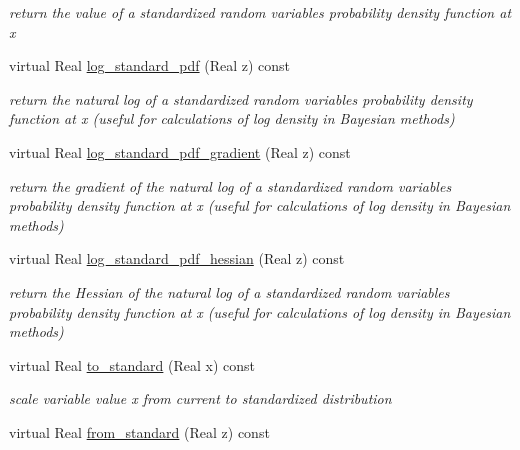 \begin{DoxyCompactItemize}
\begin{DoxyCompactList}\small\item\em return the value of a standardized random variable\textquotesingle{}s probability density function at x \end{DoxyCompactList}\item 
virtual Real \hyperlink{classPecos_1_1RandomVariable_a1eb7deb350fc38d35e32ba7d0b96c464}{log\+\_\+standard\+\_\+pdf} (Real z) const \label{classPecos_1_1RandomVariable_a1eb7deb350fc38d35e32ba7d0b96c464}

\begin{DoxyCompactList}\small\item\em return the natural log of a standardized random variable\textquotesingle{}s probability density function at x (useful for calculations of log density in Bayesian methods) \end{DoxyCompactList}\item 
virtual Real \hyperlink{classPecos_1_1RandomVariable_a73ea75d51f5415f600bebbca4a9628b7}{log\+\_\+standard\+\_\+pdf\+\_\+gradient} (Real z) const \label{classPecos_1_1RandomVariable_a73ea75d51f5415f600bebbca4a9628b7}

\begin{DoxyCompactList}\small\item\em return the gradient of the natural log of a standardized random variable\textquotesingle{}s probability density function at x (useful for calculations of log density in Bayesian methods) \end{DoxyCompactList}\item 
virtual Real \hyperlink{classPecos_1_1RandomVariable_acf89562740c674e54901e97817f56b69}{log\+\_\+standard\+\_\+pdf\+\_\+hessian} (Real z) const \label{classPecos_1_1RandomVariable_acf89562740c674e54901e97817f56b69}

\begin{DoxyCompactList}\small\item\em return the Hessian of the natural log of a standardized random variable\textquotesingle{}s probability density function at x (useful for calculations of log density in Bayesian methods) \end{DoxyCompactList}\item 
virtual Real \hyperlink{classPecos_1_1RandomVariable_a42e98c7343a1ce031f5481c11476fa73}{to\+\_\+standard} (Real x) const \label{classPecos_1_1RandomVariable_a42e98c7343a1ce031f5481c11476fa73}

\begin{DoxyCompactList}\small\item\em scale variable value x from current to standardized distribution \end{DoxyCompactList}\item 
virtual Real \hyperlink{classPecos_1_1RandomVariable_a05e16ccd21e4fe4f3f74a1a98ae9dc74}{from\+\_\+standard} (Real z) const \label{classPecos_1_1RandomVariable_a05e16ccd21e4fe4f3f74a1a98ae9dc74}


\end{DoxyCompactItemize}
